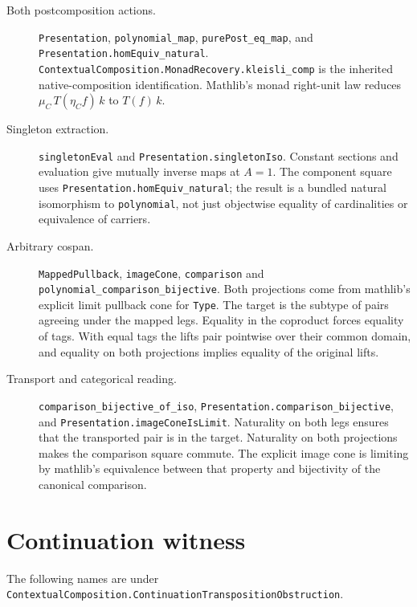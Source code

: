 \documentclass[11pt]{article}
\begin{document}
\begin{description}
\item[Both postcomposition actions.]
\nolinkurl{Presentation}, \nolinkurl{polynomial_map},
\nolinkurl{purePost_eq_map}, and \nolinkurl{Presentation.homEquiv_natural}.
\nolinkurl{ContextualComposition.MonadRecovery.kleisli_comp} is the inherited
native-composition identification. Mathlib's monad right-unit law reduces
$\mu_C\,T(\eta_C f)\,k$ to $T(f)\,k$.
\item[Singleton extraction.]
\nolinkurl{singletonEval} and \nolinkurl{Presentation.singletonIso}.
Constant sections and evaluation give mutually inverse maps at $A=1$.
The component square uses \nolinkurl{Presentation.homEquiv_natural}; the
result is a bundled natural isomorphism to \nolinkurl{polynomial}, not just
objectwise equality of cardinalities or equivalence of carriers.
\item[Arbitrary cospan.]
\nolinkurl{MappedPullback}, \nolinkurl{imageCone},
\nolinkurl{comparison} and \nolinkurl{polynomial_comparison_bijective}.
Both projections come from mathlib's explicit limit pullback cone for
\texttt{Type}. The target is the subtype of pairs agreeing under the
mapped legs. Equality in the coproduct forces equality of tags. With equal
tags the lifts pair pointwise over their common domain, and equality on both
projections implies equality of the original lifts.
\item[Transport and categorical reading.]
\nolinkurl{comparison_bijective_of_iso},
\nolinkurl{Presentation.comparison_bijective}, and
\nolinkurl{Presentation.imageConeIsLimit}.
Naturality on both legs ensures that the transported pair is in the target.
Naturality on both projections makes the comparison square commute.
The explicit image cone is limiting by mathlib's equivalence between that
property and bijectivity of the canonical comparison.
\end{description}

\section*{Continuation witness}
The following names are under
\nolinkurl{ContextualComposition.ContinuationTranspositionObstruction}.
\end{document}

